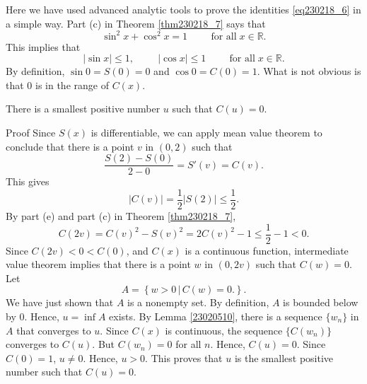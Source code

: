 Here we have used advanced analytic tools to prove the identities \eqref{eq230218_6} in a simple way.  Part (c) in Theorem \ref{thm230218_7} says that
\[\sin^2 x+\cos^2 x=1\hspace{1cm}\text{for all}\;x\in\mathbb{R}.\]
This implies that
\[|\sin x|\leq 1,\hspace{1cm} |\cos x|\leq 1\hspace{1cm}\text{for all}\;x\in\mathbb{R}.\]By definition, $\sin 0=S(0)=0$ and $\cos 0=C(0)=1$. What is not obvious is that  0 is in the range of $C(x)$. 
\begin{theorem}[label=thm230218_8]
{}
There is a smallest positive number $u$ such that $C(u)=0$. 
\end{theorem}
\begin{myproof}{Proof}
Since $S(x)$ is differentiable, we can apply mean value theorem to conclude that there is a point $v$ in $(0, 2)$ such that
\[\frac{S(2)-S(0)}{2-0}=S'(v)=C(v).\]
This gives
\[|C(v)|=\frac{1}{2}|S(2)|\leq\frac{1}{2}.\]By part (e) and part (c) in Theorem \ref{thm230218_7},
\[C(2v)= C(v)^2-S(v)^2= 2C(v)^2-1\leq \frac{1}{2}-1<0.\]
Since $C(2v)<0<C(0)$, and $C(x)$ is a continuous function, intermediate value theorem implies that there is a point $w$ in $(0, 2v)$ such that $C(w)=0$. Let 
\[A=\left\{w>0\,|\, C(w)=0.\right\}.\] We have just shown that $A$ is a nonempty set. By definition, $A$ is bounded below by 0. Hence, $u=\inf A$ exists. By Lemma \ref{23020510}, there is a sequence $\{w_n\}$ in $A$ that converges to $u$. Since $C(x)$ is continuous, the sequence $\{C(w_n)\}$ converges to $C(u)$. But $C(w_n)=0$ for all $n$. Hence, $C(u)=0$. Since $C(0)=1$, $u\neq 0$. Hence, $u>0$. This proves that 
$u$ is the smallest positive number such that $C(u)=0$. \end{myproof}

